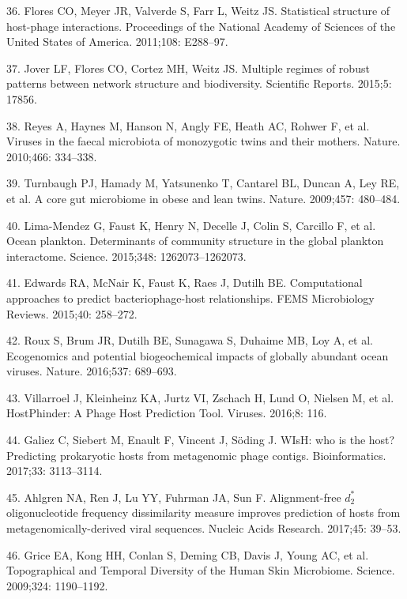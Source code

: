 \documentclass[12pt,]{article}
\begin{document}
\hypertarget{ref-Flores:2011bh}{}
36. Flores CO, Meyer JR, Valverde S, Farr L, Weitz JS. Statistical
structure of host-phage interactions. Proceedings of the National
Academy of Sciences of the United States of America. 2011;108: E288--97.

\hypertarget{ref-Jover:2015ev}{}
37. Jover LF, Flores CO, Cortez MH, Weitz JS. Multiple regimes of robust
patterns between network structure and biodiversity. Scientific Reports.
2015;5: 17856.

\hypertarget{ref-Reyes:2010cwa}{}
38. Reyes A, Haynes M, Hanson N, Angly FE, Heath AC, Rohwer F, et al.
Viruses in the faecal microbiota of monozygotic twins and their mothers.
Nature. 2010;466: 334--338.

\hypertarget{ref-Turnbaugh:2009ei}{}
39. Turnbaugh PJ, Hamady M, Yatsunenko T, Cantarel BL, Duncan A, Ley RE,
et al. A core gut microbiome in obese and lean twins. Nature. 2009;457:
480--484.

\hypertarget{ref-LimaMendez:2015hw}{}
40. Lima-Mendez G, Faust K, Henry N, Decelle J, Colin S, Carcillo F, et
al. Ocean plankton. Determinants of community structure in the global
plankton interactome. Science. 2015;348: 1262073--1262073.

\hypertarget{ref-Edwards:2015iz}{}
41. Edwards RA, McNair K, Faust K, Raes J, Dutilh BE. Computational
approaches to predict bacteriophage-host relationships. FEMS
Microbiology Reviews. 2015;40: 258--272.

\hypertarget{ref-Roux:2016cc}{}
42. Roux S, Brum JR, Dutilh BE, Sunagawa S, Duhaime MB, Loy A, et al.
Ecogenomics and potential biogeochemical impacts of globally abundant
ocean viruses. Nature. 2016;537: 689--693.

\hypertarget{ref-Villarroel:2016jy}{}
43. Villarroel J, Kleinheinz KA, Jurtz VI, Zschach H, Lund O, Nielsen M,
et al. HostPhinder: A Phage Host Prediction Tool. Viruses. 2016;8: 116.

\hypertarget{ref-Galiez:2017gm}{}
44. Galiez C, Siebert M, Enault F, Vincent J, Söding J. WIsH: who is the
host? Predicting prokaryotic hosts from metagenomic phage contigs.
Bioinformatics. 2017;33: 3113--3114.

\hypertarget{ref-Ahlgren:2017gh}{}
45. Ahlgren NA, Ren J, Lu YY, Fuhrman JA, Sun F. Alignment-free
\(d_2^*\) oligonucleotide frequency dissimilarity measure improves
prediction of hosts from metagenomically-derived viral sequences.
Nucleic Acids Research. 2017;45: 39--53.

\hypertarget{ref-Grice:2009eea}{}
46. Grice EA, Kong HH, Conlan S, Deming CB, Davis J, Young AC, et al.
Topographical and Temporal Diversity of the Human Skin Microbiome.
Science. 2009;324: 1190--1192.
\end{document}
